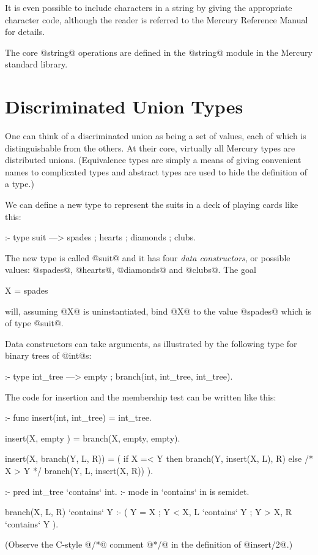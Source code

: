 
It is even possible to include characters in a string by giving the
appropriate character code, although the reader is referred to the Mercury
Reference Manual \XXX{} for details.

The core @string@ operations are defined in the @string@ module in the
Mercury standard library.

\section{Discriminated Union Types}

One can think of a discriminated union as being a set of values, each of
which is distinguishable from the others.  At their core, virtually all
Mercury types are distributed unions.
(Equivalence types are simply a means of giving convenient names to
complicated types and abstract types are used to hide the
definition of a type.)

We can define a new type to represent the suits in a deck of playing
cards like this:
\begin{myverbatim}
:- type suit ---> spades ; hearts ; diamonds ; clubs.
\end{myverbatim}
The new type is called @suit@ and it has four 
\emph{data constructors}, or possible values: @spades@, @hearts@,
@diamonds@ and @clubs@.  The goal
\begin{myverbatim}
    X = spades
\end{myverbatim}
will, assuming @X@ is uninstantiated, bind @X@ to the value @spades@ which
is of type @suit@.

Data constructors can take arguments, as illustrated by the following type
for binary trees of @int@s:
\begin{myverbatim}
:- type int_tree ---> empty ; branch(int, int_tree, int_tree).
\end{myverbatim}
The code for insertion and the membership test can be written like
this:
\begin{myverbatim}
:- func insert(int, int_tree) = int_tree.

insert(X, empty          ) = branch(X, empty, empty).

insert(X, branch(Y, L, R)) =
    (      if X =< Y then branch(Y, insert(X, L), R)
      else /* X  > Y */   branch(Y, L, insert(X, R))
    ).

:- pred int_tree `contains` int.
:- mode in       `contains` in is semidet.

branch(X, L, R) `contains` Y :-
    (   Y = X
    ;   Y < X,  L `contains` Y
    ;   Y > X,  R `contains` Y
    ).
\end{myverbatim}
(Observe the C-style @/*@ comment @*/@ in the definition of @insert/2@.)

